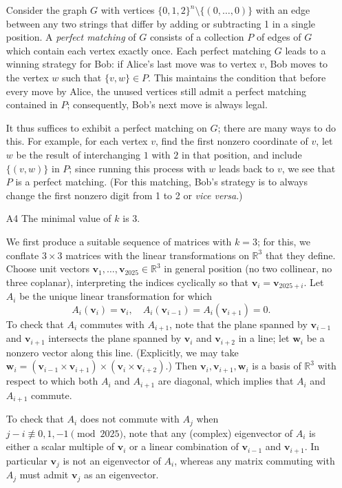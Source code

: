 \documentclass[amssymb,twocolumn,pra,10pt,aps]{revtex4-1}
\newcommand{\RR}{\mathbb{R}}
\begin{document}
\begin{itemize}
Consider the graph $G$ with vertices $\{0,1,2\}^n \setminus \{(0,\dots,0)\}$ with an edge between any two strings that differ by adding or subtracting 1 in a single position. A \emph{perfect matching} of $G$ consists of a collection $P$ of edges of $G$ which contain each vertex exactly once. Each perfect matching $G$ leads to a winning strategy for Bob: if Alice's last move was to vertex $v$, Bob moves to the vertex $w$ such that $\{v,w\} \in P$. This maintains the condition that before every move by Alice, the unused vertices still admit a perfect matching contained in $P$; consequently, Bob's next move is always legal.

It thus suffices to exhibit a perfect matching on $G$; there are many ways to do this. For example,
for each vertex $v$, find the first nonzero coordinate of $v$, let $w$ be the result of interchanging $1$ with $2$ in that position, and include $\{(v,w)\}$ in $P$; since running this process with $w$ leads back to $v$, we see that $P$ is a perfect matching. (For this matching, Bob's strategy is to  always change the first nonzero digit from 1 to 2 or \emph{vice versa}.)

\item[A4]
The minimal value of $k$ is 3.

We first produce a suitable sequence of matrices with $k=3$;
for this, we conflate $3 \times 3$ matrices with the linear transformations on $\RR^3$ that they define.
Choose unit vectors $\mathbf{v}_1,\dots,\mathbf{v}_{2025} \in \RR^3$
in general position (no two collinear, no three coplanar),
interpreting the indices cyclically so that $\mathbf{v}_i = \mathbf{v}_{2025+i}$.
Let $A_i$ be the unique linear transformation for which
\[
A_i(\mathbf{v}_i) = \mathbf{v}_i, \quad
A_i(\mathbf{v}_{i-1}) = A_i(\mathbf{v}_{i+1}) = 0.
\]
To check that $A_i$ commutes with $A_{i+1}$, note that the plane spanned by $\mathbf{v}_{i-1}$ and $\mathbf{v}_{i+1}$
intersects the plane spanned by $\mathbf{v}_i$ and $\mathbf{v}_{i+2}$ in a line; let $\mathbf{w}_i$ be a nonzero vector along this line. 
(Explicitly, we may take $\mathbf{w}_i = (\mathbf{v}_{i-1} \times \mathbf{v}_{i+1}) \times (\mathbf{v}_i \times \mathbf{v}_{i+2})$.)
Then $\mathbf{v}_i, \mathbf{v}_{i+1}, \mathbf{w}_i$ is a basis of $\RR^3$ with respect to which both $A_i$ and $A_{i+1}$ are diagonal, which implies that $A_i$ and $A_{i+1}$ commute.

To check that $A_i$ does not commute with $A_j$ when $j -i\not\equiv 0,1,-1 \pmod{2025}$,
note that any (complex) eigenvector of $A_i$ is either a scalar multiple of $\mathbf{v}_i$ or a linear combination of $\mathbf{v}_{i-1}$ and $\mathbf{v}_{i+1}$. In particular $\mathbf{v}_j$ is not an eigenvector of $A_i$, whereas
any matrix commuting with $A_j$ must admit $\mathbf{v}_j$ as an eigenvector.


\end{itemize}
\end{document}
